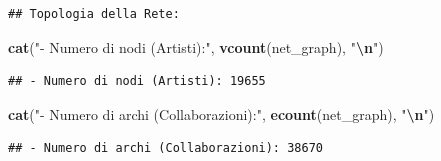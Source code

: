 \documentclass[
]{article}
\newenvironment{Shaded}{\begin{snugshade}}{\end{snugshade}}
\newcommand{\AttributeTok}[1]{\textcolor[rgb]{0.13,0.29,0.53}{#1}}
\newcommand{\CommentTok}[1]{\textcolor[rgb]{0.56,0.35,0.01}{\textit{#1}}}
\newcommand{\ConstantTok}[1]{\textcolor[rgb]{0.56,0.35,0.01}{#1}}
\newcommand{\FunctionTok}[1]{\textcolor[rgb]{0.13,0.29,0.53}{\textbf{#1}}}
\newcommand{\NormalTok}[1]{#1}
\newcommand{\OtherTok}[1]{\textcolor[rgb]{0.56,0.35,0.01}{#1}}
\newcommand{\SpecialCharTok}[1]{\textcolor[rgb]{0.81,0.36,0.00}{\textbf{#1}}}
\newcommand{\StringTok}[1]{\textcolor[rgb]{0.31,0.60,0.02}{#1}}
\begin{document}
\begin{Shaded}
\end{Shaded}

\begin{verbatim}
## Topologia della Rete:
\end{verbatim}

\begin{Shaded}
\begin{Highlighting}[]
\FunctionTok{cat}\NormalTok{(}\StringTok{"{-} Numero di nodi (Artisti):"}\NormalTok{, }\FunctionTok{vcount}\NormalTok{(net\_graph), }\StringTok{"}\SpecialCharTok{\textbackslash{}n}\StringTok{"}\NormalTok{)}
\end{Highlighting}
\end{Shaded}

\begin{verbatim}
## - Numero di nodi (Artisti): 19655
\end{verbatim}

\begin{Shaded}
\begin{Highlighting}[]
\FunctionTok{cat}\NormalTok{(}\StringTok{"{-} Numero di archi (Collaborazioni):"}\NormalTok{, }\FunctionTok{ecount}\NormalTok{(net\_graph), }\StringTok{"}\SpecialCharTok{\textbackslash{}n}\StringTok{"}\NormalTok{)}
\end{Highlighting}
\end{Shaded}

\begin{verbatim}
## - Numero di archi (Collaborazioni): 38670
\end{verbatim}
\end{document}
